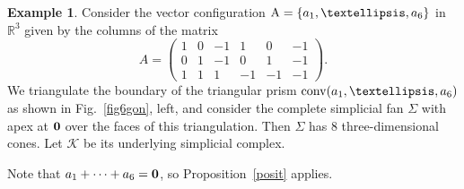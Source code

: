 \documentclass[a4paper]{amsart}
\theoremstyle{definition}
\newtheorem{example}[theorem]{Example}
\theoremstyle{remark}
\numberwithin{equation}{section}
\def\R{\mathbb R}
\def\R{\mathbb R}
\newcommand{\mb}[1]{{\textbf {\textit#1}}}
\def\conv{\mathop{\mathrm{conv}}}
\newcommand{\<}{\langle}
\renewcommand{\>}{\rangle}
\begin{document}
\begin{example}\label{prism1}
Consider the vector configuration $\mathrm A=\{\mb a_1,\ldots,\mb a_6\}$ in $\R^3$ given by the columns of the matrix 
\[
  A=\begin{pmatrix}1&0&-1&1&0&-1\\0&1&-1&0&1&-1\\
  1&1&1&-1&-1&-1\end{pmatrix}.
\]   
We triangulate the boundary of the triangular prism $\conv(\mb a_1,\ldots,\mb a_6)$
as shown in Fig.~\ref{fig6gon}, left, and consider the complete simplicial fan 
$\Sigma$ with apex at $\bf 0$ over the faces of this triangulation. Then $\Sigma$ has $8$ three-dimensional cones.  Let $\mathcal K$ be its underlying simplicial complex.

Note that $\mb a_1+\cdots+\mb a_6=\mathbf 0$, so Proposition~\ref{posit} applies.


\end{example}
\end{document}

